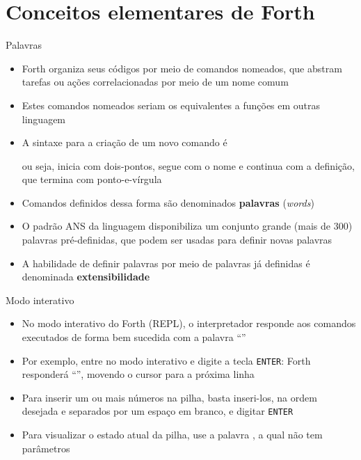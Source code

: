 \section{Conceitos elementares de Forth}

\begin{frame}[fragile]{Palavras}

    \begin{itemize}
        \item Forth organiza seus códigos por meio de comandos nomeados, que abstram tarefas
            ou ações correlacionadas por meio de um nome comum

        \item Estes comandos nomeados seriam os equivalentes a funções em outras linguagem

        \item A sintaxe para a criação de um novo comando é

        
        ou seja, inicia com dois-pontos, segue com o nome e continua com a definição, que termina
        com ponto-e-vírgula

        \item Comandos definidos dessa forma são denominados \textbf{palavras} (\textit{words})

        \item O padrão ANS da linguagem disponibiliza um conjunto grande (mais de 300) palavras
            pré-definidas, que podem ser usadas para definir novas palavras

        \item A habilidade de definir palavras por meio de palavras já definidas é denominada
            \textbf{extensibilidade}
    \end{itemize}

\end{frame}


\begin{frame}[fragile]{Modo interativo}

    \begin{itemize}
        \item No modo interativo do Forth (REPL), o interpretador responde aos comandos executados
            de forma bem sucedida com a palavra ``''

        \item Por exemplo, entre no modo interativo e digite a tecla \texttt{ENTER}: Forth responderá 
            ``'', movendo o cursor para a próxima linha

        \item Para inserir um ou mais números na pilha, basta inseri-los, na ordem desejada e 
            separados por um espaço em branco, e digitar \texttt{ENTER}

        \item Para visualizar o estado atual da pilha, use a palavra , a qual não
            tem parâmetros

    \end{itemize}
\end{frame}

